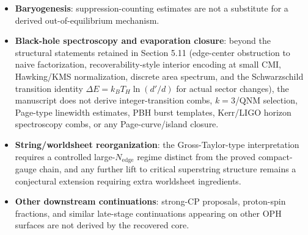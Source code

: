 \begin{itemize}
\item \textbf{Baryogenesis}: suppression-counting estimates are not a substitute for a derived out-of-equilibrium mechanism.
\item \textbf{Black-hole spectroscopy and evaporation closure}: beyond the structural statements retained in Section 5.11 (edge-center obstruction to naive factorization, recoverability-style interior encoding at small CMI, Hawking/KMS normalization, discrete area spectrum, and the Schwarzschild transition identity \(\Delta E = k_B T_H \ln(d'/d)\) for actual sector changes), the manuscript does not derive integer-transition combs, \(k=3\)/QNM selection, Page-type linewidth estimates, PBH burst templates, Kerr/LIGO horizon spectroscopy combs, or any Page-curve/island closure.
\item \textbf{String/worldsheet reorganization}: the Gross-Taylor-type interpretation~\cite{grossTaylor93} requires a controlled large-\(N_{\mathrm{edge}}\) regime distinct from the proved compact-gauge chain, and any further lift to critical superstring structure remains a conjectural extension requiring extra worldsheet ingredients.
\item \textbf{Other downstream continuations}: strong-CP proposals, proton-spin fractions, and similar late-stage continuations appearing on other OPH surfaces are not derived by the recovered core.
\end{itemize}

